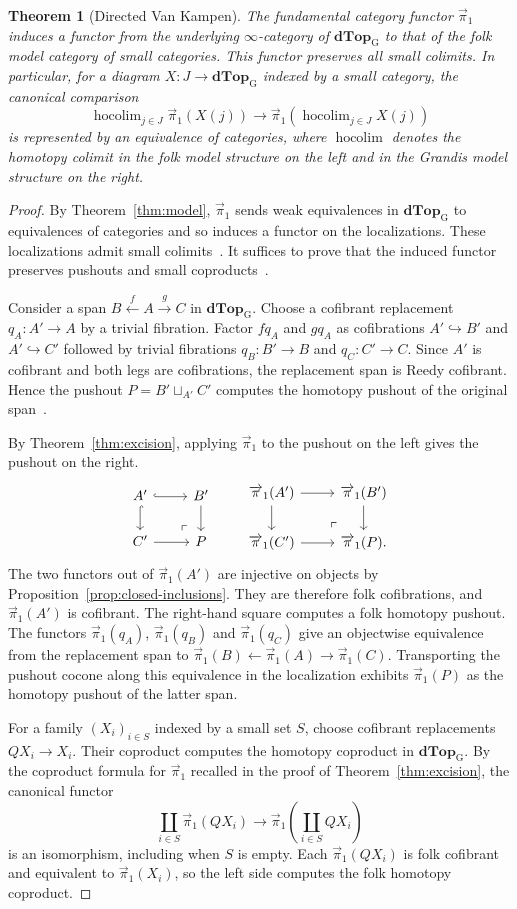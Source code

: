 \documentclass[12pt,a4paper]{amsart}
\newtheorem{theorem}{Theorem}[section]
\theoremstyle{definition}
\renewcommand{\vec}{\overrightarrow}
\newcommand{\D}{\mathbf{dTop}}
\newcommand{\MG}{\D_{\mathrm G}}
\newcommand{\PiC}{\vec{\pi}_1}
\DeclareMathOperator*{\hocolim}{hocolim}
\newcommand{\VanKampenStatement}{%
The fundamental category functor $\PiC$ induces a functor from the underlying $\infty$-category of $\MG$ to that of the folk model category of small categories. This functor preserves all small colimits. In particular, for a diagram $X\colon J\to\MG$ indexed by a small category, the canonical comparison
\[
 \hocolim_{j\in J}\PiC(X(j))\longrightarrow\PiC\!\left(\hocolim_{j\in J}X(j)\right)
\]
is represented by an equivalence of categories, where $\hocolim$ denotes the homotopy colimit in the folk model structure on the left and in the Grandis model structure on the right.
}
\begin{document}
\begin{theorem}[Directed Van Kampen]\label{thm:positive}
\VanKampenStatement
\end{theorem}
\begin{proof}
By Theorem~\ref{thm:model}, $\PiC$ sends weak equivalences in $\MG$ to equivalences of categories and so induces a functor on the localizations. These localizations admit small colimits~\cite[dual of Proposition~7.7.4]{Cisinski2019Higher}. It suffices to prove that the induced functor preserves pushouts and small coproducts~\cite[Proposition~4.4.2.7]{Lurie2009}.

Consider a span $B\xleftarrow{f}A\xrightarrow{g}C$ in $\MG$. Choose a cofibrant replacement $q_A\colon A'\to A$ by a trivial fibration. Factor $fq_A$ and $gq_A$ as cofibrations $A'\hookrightarrow B'$ and $A'\hookrightarrow C'$ followed by trivial fibrations $q_B\colon B'\to B$ and $q_C\colon C'\to C$. Since $A'$ is cofibrant and both legs are cofibrations, the replacement span is Reedy cofibrant. Hence the pushout $P=B'\sqcup_{A'}C'$ computes the homotopy pushout of the original span~\cite[Theorem~5.1.3 and Corollary~5.1.6]{MR99h:55031}.

By Theorem~\ref{thm:excision}, applying $\PiC$ to the pushout on the left gives the pushout on the right.
\[
\begin{tikzcd}
 A'\ar[r,hook]\ar[d,hook]&B'\ar[d]\\
 C'\ar[r]&P\ar[ul,phantom,"\ulcorner",very near start]
\end{tikzcd}
\qquad
\begin{tikzcd}
 \PiC(A')\ar[r]\ar[d]&\PiC(B')\ar[d]\\
 \PiC(C')\ar[r]&\PiC(P)\ar[ul,phantom,"\ulcorner",very near start].
\end{tikzcd}
\]
The two functors out of $\PiC(A')$ are injective on objects by Proposition~\ref{prop:closed-inclusions}. They are therefore folk cofibrations, and $\PiC(A')$ is cofibrant. The right-hand square computes a folk homotopy pushout. The functors $\PiC(q_A)$, $\PiC(q_B)$ and $\PiC(q_C)$ give an objectwise equivalence from the replacement span to $\PiC(B)\leftarrow\PiC(A)\to\PiC(C)$. Transporting the pushout cocone along this equivalence in the localization exhibits $\PiC(P)$ as the homotopy pushout of the latter span.

For a family $(X_i)_{i\in S}$ indexed by a small set $S$, choose cofibrant replacements $QX_i\to X_i$. Their coproduct computes the homotopy coproduct in $\MG$. By the coproduct formula for $\PiC$ recalled in the proof of Theorem~\ref{thm:excision}, the canonical functor
\[
 \coprod_{i\in S}\PiC(QX_i)\longrightarrow\PiC\!\left(\coprod_{i\in S}QX_i\right)
\]
is an isomorphism, including when $S$ is empty. Each $\PiC(QX_i)$ is folk cofibrant and equivalent to $\PiC(X_i)$, so the left side computes the folk homotopy coproduct.


\end{proof}
\end{document}
